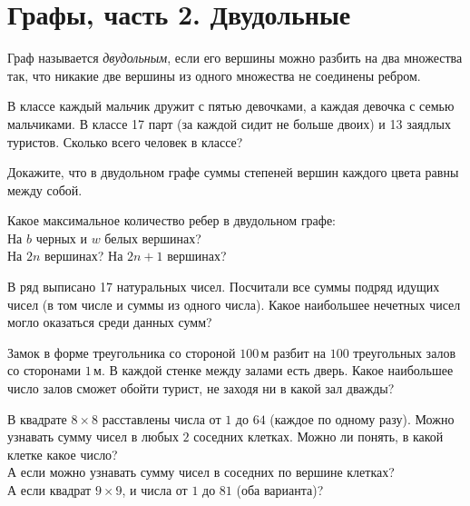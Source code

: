 

\section*{Графы, часть 2. Двудольные}


Граф называется \emph{двудольным}, если его вершины можно разбить на два
множества так, что никакие две вершины из одного множества не соединены ребром.

\begin{problems}

\item
В классе каждый мальчик дружит с пятью девочками, а каждая девочка с семью
мальчиками.
В классе 17 парт (за каждой сидит не больше двоих) и 13 заядлых туристов.
Сколько всего человек в классе?

\item
Докажите, что в двудольном графе суммы степеней вершин каждого цвета равны
между собой.

\item
Какое максимальное количество ребер в двудольном графе:
\\
\sbp На $b$ черных и $w$ белых вершинах?
\\
\sbp На $2 n$ вершинах?
\qquad
\sbp На $2 n + 1$ вершинах?

\item
В ряд выписано 17 натуральных чисел.
Посчитали все суммы подряд идущих чисел (в том числе и суммы из одного числа).
Какое наибольшее нечетных чисел могло оказаться среди данных сумм?


\item
Замок в форме треугольника со стороной $100\,\text{м}$ разбит на $100$
треугольных залов со сторонами $1\,\text{м}$.
В каждой стенке между залами есть дверь.
Какое наибольшее число залов сможет обойти турист, не заходя ни в какой зал
дважды?

\item
\sbp
В квадрате $8 \times 8$ расставлены числа от $1$ до $64$
(каждое по одному разу).
Можно узнавать сумму чисел в любых $2$ соседних клетках.
Можно ли понять, в какой клетке какое число?
\\
\sbp
А если можно узнавать сумму чисел в соседних по вершине клетках?
\\
\sbp
А если квадрат $9 \times 9$, и числа от $1$ до $81$ (оба варианта)?


\end{problems}
